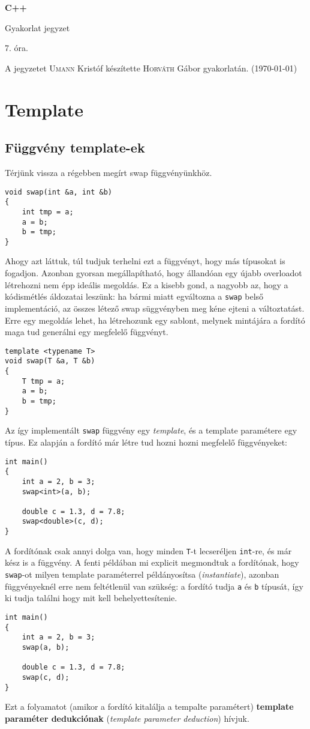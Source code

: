 \documentclass[a4paper,11.5pt,table]{article}
\begin{document}
	\setlength\parindent{0pt}
	\def\<{<\hspace{0mm}<}
	
	\theoremstyle{definition}
	\newtheorem{note}{Megjegyzés}[subsection]
	
	\begin{center}
		{\LARGE\textbf{C++}}
		
		{\Large Gyakorlat jegyzet}
		
		7. óra.
	\end{center}
	A jegyzetet \textsc{Umann} Kristóf készítette \textsc{Horváth} Gábor gyakorlatán. (\today)
	
	\section{Template}
	\subsection{Függvény template-ek}
	Térjünk vissza a régebben megírt swap függvényünkhöz.
	\begin{lstlisting}
void swap(int &a, int &b)
{
	int tmp = a;
	a = b;
	b = tmp;
}
	\end{lstlisting}
	Ahogy azt láttuk, túl tudjuk terhelni ezt a függvényt, hogy más típusokat is fogadjon.
	Azonban gyorsan megállapítható, hogy állandóan egy újabb overloadot létrehozni nem épp ideális megoldás. Ez a kisebb gond, a nagyobb az, hogy a kódismétlés áldozatai leszünk: ha bármi miatt egváltozna a \texttt{swap} belső implementáció, az összes létező swap süggvényben meg kéne ejteni a változtatást. Erre egy megoldás lehet, ha létrehozunk egy sablont, melynek mintájára a fordító maga tud generálni egy megfelelő függvényt.
	\begin{lstlisting}
template <typename T>
void swap(T &a, T &b)
{
	T tmp = a;
	a = b;
	b = tmp;
}
	\end{lstlisting}
	Az így implementált \texttt{swap} függvény egy \textit{template}, és a template paramétere egy típus. Ez alapján a fordító már létre tud hozni hozni megfelelő függvényeket:
	\begin{lstlisting}
int main()
{
	int a = 2, b = 3;
	swap<int>(a, b);
	
	double c = 1.3, d = 7.8;
	swap<double>(c, d);
}
	\end{lstlisting}
	A fordítónak csak annyi dolga van, hogy minden \texttt{T}-t lecseréljen \texttt{int}-re, és már kész is a függvény. A fenti példában mi explicit megmondtuk a fordítónak, hogy \texttt{swap}-ot milyen template paraméterrel {példányosítsa} (\textit{instantiate}), azonban függvényeknél erre nem feltétlenül van szükség: a fordító tudja \texttt{a} és \texttt{b} típusát, így ki tudja találni hogy mit kell behelyettesítenie.
	\begin{lstlisting}
int main()
{
	int a = 2, b = 3;
	swap(a, b);
	
	double c = 1.3, d = 7.8;
	swap(c, d);
}
	\end{lstlisting}
	Ezt a folyamatot (amikor a fordító kitalálja a tempalte paramétert) \textbf{template paraméter dedukciónak} (\textit{template parameter deduction}) hívjuk.
	
\end{document}
